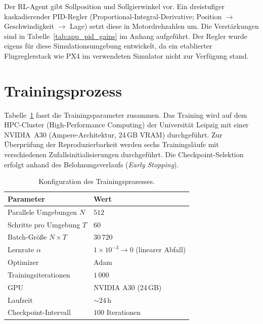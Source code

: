 Der RL-Agent gibt Sollposition und Sollgierwinkel vor. Ein dreistufiger
kaskadierender PID-Regler (Proportional-Integral-Derivative; Position
$\rightarrow$ Geschwindigkeit $\rightarrow$ Lage) setzt diese in
Motordrehzahlen um. Die Verstärkungen sind in
Tabelle~\ref{tab:app_pid_gains} im Anhang aufgeführt. Der Regler wurde
eigens für diese Simulationsumgebung entwickelt, da ein etablierter
Flugreglerstack wie PX4 \autocite{meierPX4NodebasedMultithreaded2015} im verwendeten Simulator nicht zur Verfügung
stand.

\section{Trainingsprozess}
\label{sec:meth_trainingsprozess}

Tabelle~\ref{tab:meth_training} fasst die Trainingsparameter zusammen.
Das Training wird auf dem HPC-Cluster (High-Performance Computing) der
Universität Leipzig mit einer NVIDIA~A30 (Ampere-Architektur, 24\,GB
VRAM) durchgeführt. Zur Überprüfung
der Reproduzierbarkeit werden sechs Trainingsläufe mit verschiedenen
Zufallsinitialisierungen durchgeführt. Die Checkpoint-Selektion erfolgt
anhand des Belohnungsverlaufs (\textit{Early Stopping}).

\begin{table}[ht]
\centering
\caption{Konfiguration des Trainingsprozesses.}
\label{tab:meth_training}
\small
\begin{tabular}{l l}
\toprule
\textbf{Parameter} & \textbf{Wert} \\
\midrule
Parallele Umgebungen $N$        & $512$ \\
Schritte pro Umgebung $T$      & $60$ \\
Batch-Größe $N \times T$       & $30\,720$ \\
Lernrate $\alpha$               & $1 \times 10^{-3} \to 0$ (linearer Abfall) \\
Optimizer                       & Adam \\
Trainingsiterationen            & $1\,000$ \\
GPU                             & NVIDIA A30 (24\,GB) \\
Laufzeit                        & ${\sim}24$\,h \\
Checkpoint-Intervall            & $100$ Iterationen \\
\bottomrule
\end{tabular}
\end{table}

